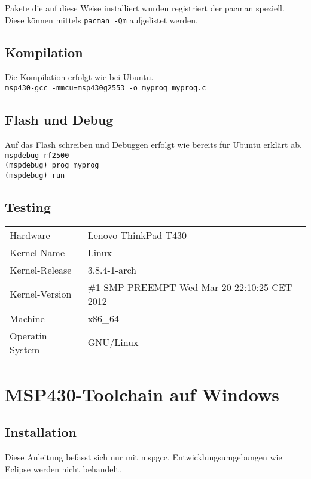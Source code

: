Pakete die auf diese Weise installiert wurden registriert der pacman speziell.
Diese können mittels \verb!pacman -Qm! aufgelistet werden.

\subsection{Kompilation}
Die Kompilation erfolgt wie bei Ubuntu. \\

\verb!msp430-gcc -mmcu=msp430g2553 -o myprog myprog.c!

\subsection{Flash und Debug}
Auf das Flash schreiben und Debuggen erfolgt wie bereits für Ubuntu erklärt
ab.\\

\verb!mspdebug rf2500!\\

\verb!(mspdebug) prog myprog!\\

\verb!(mspdebug) run!\\


\subsection{Testing}
\begin{table}[h!]
\centering
\begin{tabular}{ l l }
Hardware        & Lenovo ThinkPad T430 \\
Kernel-Name     & Linux \\
Kernel-Release  & 3.8.4-1-arch \\
Kernel-Version  & \#1 SMP PREEMPT Wed Mar 20 22:10:25 CET 2012 \\
Machine         & x86\_64 \\
Operatin System & GNU/Linux\\
\end{tabular}
\end{table}



\section{MSP430-Toolchain auf Windows}
\subsection{Installation}
Diese Anleitung befasst sich nur mit mspgcc. Entwicklungsumgebungen wie Eclipse 
werden nicht behandelt. 
